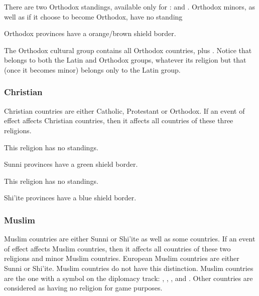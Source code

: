 \aparag There are two Orthodox standings, available only for \RUS:
 and .
\bparag Orthodox minors, as well as \POL if it choose to become Orthodox, have
no standing

\aparag Orthodox provinces have a orange/brown shield border.

\aparag The Orthodox cultural group contains all Orthodox countries, plus
\POL.
\bparag Notice that \POL belongs to both the Latin and Orthodox groups,
whatever its religion but that \paysPologne (once it becomes minor) belongs
only to the Latin group.


\subsubsection{Christian}
\aparag Christian countries are either Catholic, Protestant or Orthodox.
\bparag If an event of effect affects Christian countries, then it affects all
countries of these three religions.

\aparag This religion has no standings.

\aparag Sunni provinces have a green shield border.

\aparag This religion has no standings.

\aparag Shi'ite provinces have a blue shield border.


\subsubsection{Muslim}
\aparag Muslim countries are either Sunni or Shi'ite as well as some \ROTW
countries.
\bparag If an event of effect affects Muslim countries, then it affects all
countries of these two religions and \ROTW minor Muslim countries.
\bparag European Muslim countries are either Sunni or Shi'ite. \ROTW Muslim
countries do not have this distinction.
\bparag \ROTW Muslim countries are the one with a \Xsunnite symbol on the
\ROTW diplomacy track: , \paysAden, \paysOman, \paysSoudan and
\paysGujerat. Other \ROTW countries are considered as having no religion for
game purposes.

